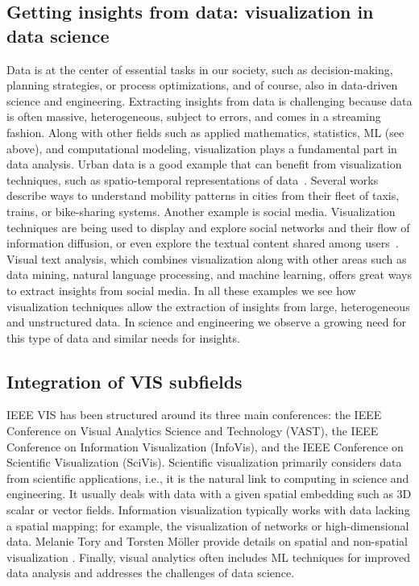\documentclass[10pt,journal,compsoc]{IEEEtran}
\begin{document}
\subsection*{Getting insights from data: visualization in data science}

Data is at the center of essential tasks in our society, such as decision-making, planning strategies, or process optimizations, and of course, also in data-driven science and engineering. 
Extracting insights from data is challenging because data is often massive, heterogeneous, subject to errors, and comes in a streaming fashion. Along with other fields such as applied mathematics, statistics, ML (see above), and computational modeling, visualization plays a fundamental part in data analysis. Urban data is a good example that can benefit from visualization techniques, such as spatio-temporal representations of data~\cite{Doraiswamy2018}. Several works describe ways to understand mobility patterns in cities from their fleet of taxis, trains, or bike-sharing systems. 
Another example is social media. Visualization techniques are being used to display and explore social networks and their flow of information diffusion, or even explore the textual content shared among users~\cite{Chen2017}. Visual text analysis, which combines visualization along with other areas such as data mining, natural language processing, and machine learning, offers great ways to extract insights from social media. In all these examples we see how visualization techniques allow the extraction of insights from large, heterogeneous and unstructured data. In science and engineering we observe a growing need for this type of data and similar needs for insights. 


\subsection*{Integration of VIS subfields}

IEEE VIS has been structured around its three main conferences: the IEEE Conference on Visual Analytics Science and Technology (VAST), the IEEE Conference on Information Visualization (InfoVis), and the IEEE Conference on Scientific Visualization (SciVis). 
Scientific visualization primarily considers data from scientific applications, i.e., it is the natural link to computing in science and engineering. It usually deals with data with a given spatial embedding such as 3D scalar or vector fields. Information visualization typically works with data lacking a spatial mapping; for example, the visualization of networks or high-dimensional data. Melanie Tory and Torsten M{\"o}ller provide details on spatial and non-spatial visualization \cite{ToryM04}. Finally, visual analytics often includes ML techniques for improved data analysis and addresses the challenges of data science.
\end{document}

